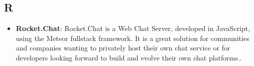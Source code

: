\subsection*{R}
\begin{itemize}
	\item
	\textbf{Rocket.Chat}: Rocket.Chat is a Web Chat Server, developed in JavaScript, using the Meteor fullstack framework. It is a great solution for communities and companies wanting to privately host their own chat service or for developers looking forward to build and evolve their own chat platforms..
\end{itemize}
\newpage